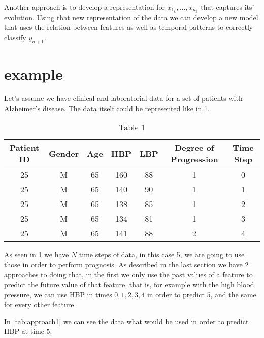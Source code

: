 Another approach is to develop a representation for $x_{1_k},...,x_{n_k}$ that captures its’ evolution. Using that new representation of the 
data we can develop a new model that uses the relation between features as well as temporal patterns to correctly classify $y_{n+1}$.

\section{example}
\label{section:example}

Let’s assume we have clinical and laboratorial data for a set of patients with Alzheimer’s disease. The data itself could be 
represented like in \ref{tab:diagnostic}. 

\begin{table}[h]
\begin{center}
\begin{tabular}{ccccccc}
\textbf{Patient ID} & \textbf{Gender} & \textbf{Age} & \textbf{HBP} & \textbf{LBP} & \textbf{Degree of Progression} & \textbf{Time Step} \\ \hline
25         & M      & 65  & 160 & 88  & 1                     & 0         \\
25         & M      & 65  & 140 & 90  & 1                     & 1         \\
25         & M      & 65  & 138 & 85  & 1                     & 2         \\
25         & M      & 65  & 134 & 81  & 1                     & 3         \\
25         & M      & 65  & 141 & 88  & 2                     & 4         \\ \hline
\end{tabular}
\caption{Table 1}
\label{tab:diagnostic}
\end{center}
\end{table}
 
As seen in \ref{tab:diagnostic} we have $N$ time steps of data, in this case 5, we are going to use those in order to perform prognosis. As described
 in the last section we have 2 approaches to doing that, in the first we only use the past values of a feature to predict the future
 value of that feature, that is, for example with the high blood pressure, we can use HBP in times $0,1,2,3,4$ in order to predict $5$, and
 the same for every other feature.

In \ref{tab:approach1} we can see the data what would be used in order to predict HBP at time $5$.

